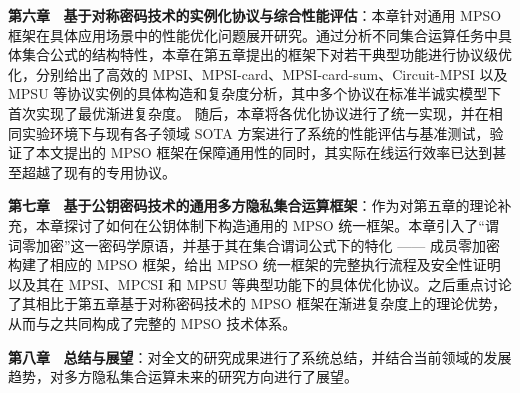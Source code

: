 \textbf{第六章 \ 基于对称密码技术的实例化协议与综合性能评估}：本章针对通用 MPSO 框架在具体应用场景中的性能优化问题展开研究。通过分析不同集合运算任务中具体集合公式的结构特性，本章在第五章提出的框架下对若干典型功能进行协议级优化，分别给出了高效的 MPSI、MPSI-card、MPSI-card-sum、Circuit-MPSI 以及 MPSU 等协议实例的具体构造和复杂度分析，其中多个协议在标准半诚实模型下首次实现了最优渐进复杂度。
随后，本章将各优化协议进行了统一实现，并在相同实验环境下与现有各子领域 SOTA 方案进行了系统的性能评估与基准测试，验证了本文提出的 MPSO 框架在保障通用性的同时，其实际在线运行效率已达到甚至超越了现有的专用协议。

\textbf{第七章 \ 基于公钥密码技术的通用多方隐私集合运算框架}：作为对第五章的理论补充，本章探讨了如何在公钥体制下构造通用的 MPSO 统一框架。本章引入了“谓词零加密”这一密码学原语，并基于其在集合谓词公式下的特化 —— 成员零加密构建了相应的 MPSO 框架，给出 MPSO 统一框架的完整执行流程及安全性证明以及其在 MPSI、MPCSI 和 MPSU 等典型功能下的具体优化协议。之后重点讨论了其相比于第五章基于对称密码技术的 MPSO 框架在渐进复杂度上的理论优势，从而与之共同构成了完整的 MPSO 技术体系。

\textbf{第八章 \ 总结与展望}：对全文的研究成果进行了系统总结，并结合当前领域的发展趋势，对多方隐私集合运算未来的研究方向进行了展望。